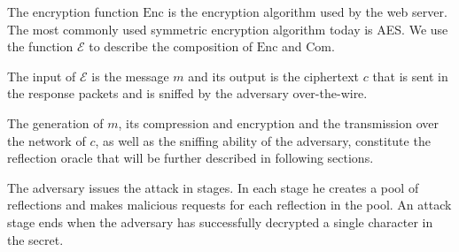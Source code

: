 The encryption function $\textrm{Enc}$ is the encryption algorithm used by the
web server. The most commonly used symmetric encryption algorithm today is AES.
We use the function $\mathcal{E}$ to describe the composition of $\textrm{Enc}$
and $\textrm{Com}$.

The input of $\mathcal{E}$ is the message $m$ and its output is the ciphertext
$c$ that is sent in the response packets and is sniffed by the adversary
over-the-wire.

The generation of $m$, its compression and encryption and the transmission over
the network of $c$, as well as the sniffing ability of the adversary, constitute
the reflection oracle that will be further described in following sections.

The adversary issues the attack in stages. In each stage he creates a pool of
reflections and makes malicious requests for each reflection in the pool. An
attack stage ends when the adversary has successfully decrypted a single
character in the secret.
